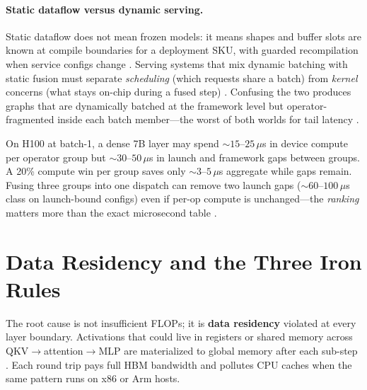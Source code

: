 \paragraph{Static dataflow versus dynamic serving.}
Static dataflow does not mean frozen models: it means shapes and buffer slots are known at compile boundaries for a deployment SKU, with guarded recompilation when service configs change \citep{yirage2026}.
Serving systems that mix dynamic batching with static fusion must separate \emph{scheduling} (which requests share a batch) from \emph{kernel} concerns (what stays on-chip during a fused step) \citep{kwon2023vllm}.
Confusing the two produces graphs that are dynamically batched at the framework level but operator-fragmented inside each batch member---the worst of both worlds for tail latency \citep{patel2025llminference,memoryfloor2026}.

\begin{example}
On H100 at batch-1, a dense 7B layer may spend ${\sim}15$--$25$\,$\mu$s in device compute per operator group but ${\sim}30$--$50$\,$\mu$s in launch and framework gaps between groups.
A 20\% compute win per group saves only ${\sim}3$--$5$\,$\mu$s aggregate while gaps remain.
Fusing three groups into one dispatch can remove two launch gaps (${\sim}60$--$100$\,$\mu$s class on launch-bound configs) even if per-op compute is unchanged---the \emph{ranking} matters more than the exact microsecond table \citep{taxbreak2026}.
\end{example}

\section{Data Residency and the Three Iron Rules}
\label{sec:data_residency}

The root cause is not insufficient FLOPs; it is \textbf{data residency} violated at every layer boundary.
Activations that could live in registers or shared memory across QKV$\rightarrow$attention$\rightarrow$MLP are materialized to global memory after each sub-step \citep{memoryfloor2026}.
Each round trip pays full HBM bandwidth and pollutes CPU caches when the same pattern runs on x86 or Arm hosts.

